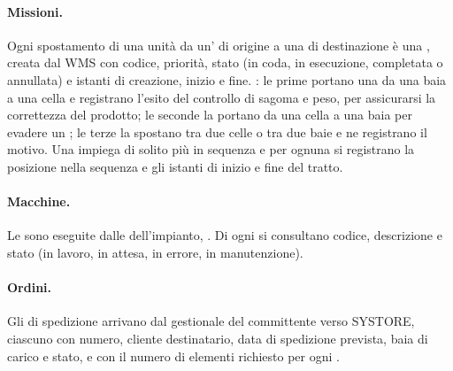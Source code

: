 \paragraph{Missioni.}
Ogni spostamento di una unità da un' di origine a una di destinazione è una
, creata dal WMS con codice, priorità, stato (in coda, in esecuzione, completata o
annullata) e istanti di creazione, inizio e fine. : le prime portano una  da
una baia a una cella e registrano l'esito del controllo di sagoma e peso, per assicurarsi la
correttezza del prodotto; le seconde la portano da una cella a una baia per evadere un
; le terze la spostano tra due celle o tra due baie e ne registrano il motivo. Una
 impiega di solito più  in sequenza e per ognuna si registrano la
posizione nella sequenza e gli istanti di inizio e fine del tratto.

\paragraph{Macchine.}
Le  sono eseguite dalle  dell'impianto, . Di ogni  si consultano codice, descrizione e
stato (in lavoro, in attesa, in errore, in manutenzione).

\paragraph{Ordini.}
Gli  di spedizione arrivano dal gestionale del committente verso SYSTORE, ciascuno con
numero, cliente destinatario, data di spedizione prevista, baia di carico e stato, e con il numero di
elementi richiesto per ogni .
